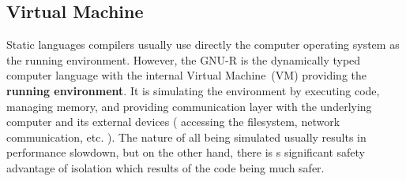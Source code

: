 \documentclass[thesis=M,english]{FITthesis}[2018/10/20]
\begin{document}





\subsection{Virtual Machine}\label{VM}

Static languages compilers usually use directly the computer operating system as the running environment. However, the GNU-R is the dynamically typed computer language with the internal Virtual Machine~(VM) providing the \textbf{running environment}.
It is simulating the environment by executing code, managing memory, and providing communication layer with the underlying computer and its external devices ( accessing the filesystem, network communication, etc. ). The nature of all being simulated usually results in performance slowdown, but on the other hand, there is s significant safety advantage of isolation which results of the code being much safer.
\end{document}
